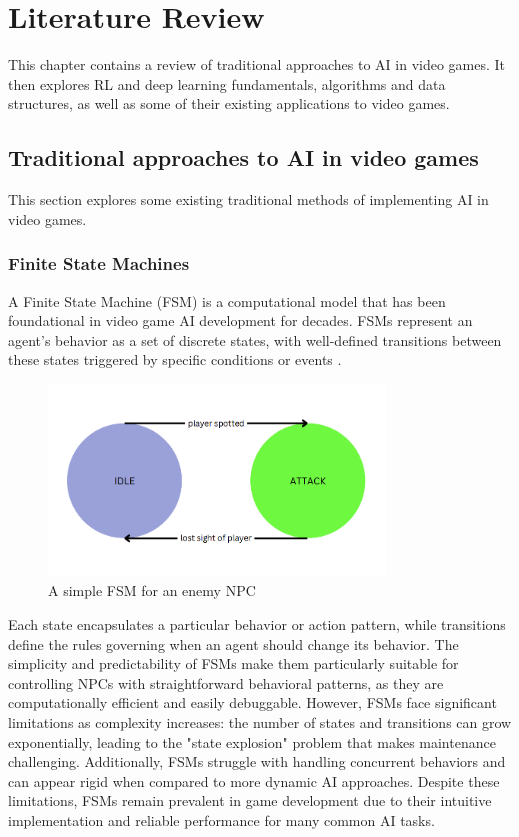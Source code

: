 \chapter{Literature Review}

This chapter contains a review of traditional approaches to AI in video games.
It then explores RL and deep learning fundamentals, algorithms and data structures, as well as some of their existing applications to video games.

\section{Traditional approaches to AI in video games}

This section explores some existing traditional methods of implementing AI in video games.

\subsection{Finite State Machines}

A Finite State Machine (FSM) is a computational model that has been foundational in video game AI development for decades. 
FSMs represent an agent's behavior as a set of discrete states, with well-defined transitions between these states triggered by specific conditions or events \cite{spiceworks_fsm}. 

\begin{figure}[h]
    \centering
    \includegraphics[width=0.8\textwidth]{figures/fsm_example.png}
    \caption{A simple FSM for an enemy NPC}
    \label{fig:fsm}
\end{figure}

Each state encapsulates a particular behavior or action pattern, while transitions define the rules governing when an agent should change its behavior. 
The simplicity and predictability of FSMs make them particularly suitable for controlling NPCs with straightforward behavioral patterns, as they are computationally efficient and easily debuggable.
However, FSMs face significant limitations as complexity increases: the number of states and transitions can grow exponentially, leading to the "state explosion" problem that makes maintenance challenging.
Additionally, FSMs struggle with handling concurrent behaviors and can appear rigid when compared to more dynamic AI approaches. 
Despite these limitations, FSMs remain prevalent in game development due to their intuitive implementation and reliable performance for many common AI tasks.

